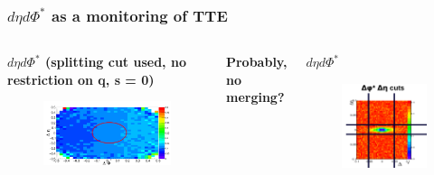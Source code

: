 \documentclass[dvipsnames] {beamer}
\begin{document}
\begin{frame}
  \bf 
  \frametitle{\bf \centering $d\eta d\Phi^{*}$ as a monitoring of TTE}
  \begin{columns}[c]
    \begin{block}{\bf \centering $d\eta d\Phi^{*}$ (splitting cut used, no restriction on q, s = 0)}
     \begin{figure}[H]
        \includegraphics[width=1.\textwidth]{deltaPhiStarDeltaEta.png}
      \end{figure}
   \end{block}
    \begin{block}{}
      \bf \centering Probably, no merging?
    \end{block}
    \begin{block}{\bf \centering $d\eta d\Phi^{*}$}
      \begin{figure}[H]
        \includegraphics[width=1.\textwidth]{deltaEtadeltaPhi_howto.png}

\end{figure}
\end{block}
\end{columns}
\end{frame}
\end{document}
